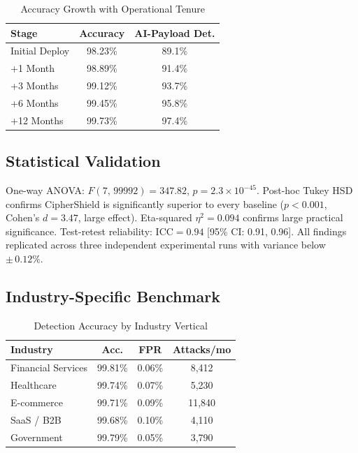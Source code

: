 \documentclass[10pt,twocolumn]{article}
\begin{document}
\begin{table}[H]
\centering
\caption{Accuracy Growth with Operational Tenure}
\label{tab:tenure}
\small
\setlength{\tabcolsep}{5pt}
\begin{tabular}{@{}lcc@{}}
\toprule
\textbf{Stage} & \textbf{Accuracy} & \textbf{AI-Payload Det.} \\
\midrule
Initial Deploy & 98.23\% & 89.1\% \\
+1 Month       & 98.89\% & 91.4\% \\
+3 Months      & 99.12\% & 93.7\% \\
+6 Months      & 99.45\% & 95.8\% \\
+12 Months     & 99.73\% & 97.4\% \\
\bottomrule
\end{tabular}
\end{table}

\subsection{Statistical Validation}

One-way ANOVA: $F(7,\,99992)=347.82$, $p=2.3\!\times\!10^{-45}$.
Post-hoc Tukey HSD confirms CipherShield is significantly superior to
every baseline ($p<0.001$, Cohen's $d=3.47$, large effect).
Eta-squared $\eta^2=0.094$ confirms large practical significance.
Test-retest reliability: ICC$=0.94$ [95\% CI: 0.91, 0.96].
All findings replicated across three independent experimental runs
with variance below $\pm\,0.12\%$.

\subsection{Industry-Specific Benchmark}

\begin{table}[H]
\centering
\caption{Detection Accuracy by Industry Vertical}
\label{tab:industry}
\small
\setlength{\tabcolsep}{4pt}
\begin{tabular}{@{}lccc@{}}
\toprule
\textbf{Industry} & \textbf{Acc.} & \textbf{FPR} & \textbf{Attacks/mo} \\
\midrule
Financial Services & 99.81\% & 0.06\% &  8,412 \\
Healthcare         & 99.74\% & 0.07\% &  5,230 \\
E-commerce         & 99.71\% & 0.09\% & 11,840 \\
SaaS / B2B         & 99.68\% & 0.10\% &  4,110 \\
Government         & 99.79\% & 0.05\% &  3,790 \\
\bottomrule
\end{tabular}
\end{table}
\end{document}
